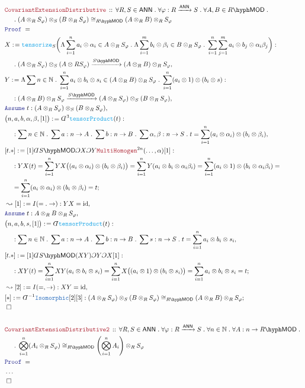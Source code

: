 \documentclass[12pt]{scrartcl}%
\newcommand{\TYPE}[1]{\textcolor{NavyBlue}{\mathtt{#1}}}%
\newcommand{\FUNC}[1]{\textcolor{Cerulean}{\mathtt{#1}}}%
\newcommand{\LOGIC}[1]{\textcolor{Blue}{\mathtt{#1}}}%
\newcommand{\THM}[1]{\textcolor{Maroon}{\mathtt{#1}}}%
\renewcommand{\.}{\; . \;} %
\newcommand{\de}{: \kern 0.1pc =} %
\newcommand{\Theorem}[2]{& \THM{#1} \, :: \, #2 \\ & \Proof = \\ } %
\newcommand{\NewLine}{\\ & \kern 1pc}%
\newcommand{\Page}[1]{ \begin{align*} #1 \end{align*}  }%
\newcommand{ \bd }{ \ByDef }%
\newcommand{\NoProof}{ & \ldots \\ \EndProof}%
\newcommand{\Nat}{\mathbb{N}}%
\DeclareMathOperator*{\id}{id}%
\newcommand{\Say}[3]{& #1 \de #2 : #3, \\} %
\newcommand{\Conclude}[3]{& #1 \de #2 : #3; \\}%
\newcommand{\Derive}[3]{& \leadsto #1 \de #2 : #3, \\} %
\newcommand{\Assume}[2]{& \LOGIC{Assume} \; #1 : #2, \\} %
\newcommand{\QED}{\; \square} %
\newcommand{\EndProof}{& \QED \\} %
\newcommand{\ByDef}{\rotatebox[origin=c]{-180}{$D$}}%
\newcommand{\ByConstr}{\rotatebox[origin=c]{-180}{$C$}}%
\newcommand{\Proof}{\LOGIC{Proof} \; } %
\newcommand{\Arrow}[1]{\xrightarrow{#1}}%
\newcommand{\LMOD}[1]{#1\hyph\mathsf{MOD}} %
\newcommand{\ANN}{\mathsf{ANN}} %
\begin{document}
\Page{
	\Theorem{CovariantExtensionDistributive}{
			\forall R,S \in \ANN \. 
			\forall \varphi : R \Arrow{\ANN} S \.
			\forall A,B \in \LMOD{R} \. \NewLine \. 
			 (A \otimes_R S_\varphi) \otimes_S (B \otimes_R S_\varphi ) \cong_{\LMOD{R}} (A \otimes_R B) \otimes_R  S_\varphi
		}
	\Say{X}{
		\FUNC{tensorize}_S \bigg( 
			 \Lambda   \sum^n_{i=1} a_i \otimes \alpha_i \in A \otimes_R S_\varphi \.
			 \Lambda  \sum^m_{i=1} b_i \otimes \beta_i \in B \otimes_R S_\varphi  \.  
			 \sum^n_{i=1} \sum^m_{j=1} a_i \otimes b_j \otimes \alpha_i \beta_j 
		\bigg)
	}
	{   \NewLine \.(A \otimes_R S_\varphi) \otimes_S (A \otimes R S_\varphi)\Arrow{\LMOD{S}} (A\otimes_R B) \otimes_R S_\varphi } 
	\Say{Y}{
		\Lambda \sum n \in \Nat \. \sum^n_{i=1} a_i \otimes b_i \otimes s_i  \in (A \otimes_R B) \otimes_R S_\varphi \.
		\sum^n_{i=1}( a_i \otimes 1)  \otimes  (b_i \otimes s)
	}
	{ \NewLine : (A \otimes_R B) \otimes_R S_\varphi \Arrow{\LMOD{S}} (A \otimes_R S_\varphi) \otimes_S (B \otimes_R S_\varphi) }
	\Assume{t}{(A \otimes_R S_\varphi) \otimes_S (B \otimes_R S_\varphi)}
	\Say{\big(n,a,b,\alpha,\beta,[1]\big)}{ \bd^3 \FUNC{tensorProduct}(t)}{ \NewLine : 
		\sum n \in \Nat \. \sum a : n \to A \. \sum b : n \to B \. \sum \alpha, \beta : n \to S \.   
		t = \sum^n_{i=1} (a_i \otimes \alpha_i) \otimes (b_i \otimes \beta_i)
	}
	\Conclude{[t.*]}{[1]\bd \LMOD{S}\ByConstr X \ByConstr Y   \THM{MultiHomogen}^{2n}(\ldots,\alpha) [1]}
	{ 
			\NewLine : YX(t) = 
			\sum^n_{i=1} YX\big( (a_i \otimes \alpha_i) \otimes (b_i \otimes \beta_i) \big) =
			\sum^n_{i=1} Y(a_i \otimes b_i \otimes  \alpha_i\beta_i) =
			\sum^n_{i=1} (a_i \otimes 1) \otimes (b_i \otimes \alpha_i\beta_i) = \NewLine = 
			\sum^n_{i=1} (a_i \otimes \alpha_i) \otimes (b_i \otimes \beta_i) =
			t
	}
	\Derive{[1]}{I(=.\to)}{YX = \id}
	\Assume{t}{A \otimes_R B \otimes_R S_\varphi}
	\Say{\big(n,a,b,s,[1]\big)}{\bd \FUNC{tensorProduct}(t)}{ 
		\NewLine : \sum n \in \Nat \. \sum a : n \to A \. \sum b : n \to B \. 
			\sum s : n \to S \. t = \sum^n_{i=1} a_i \otimes b_i \otimes s_i
		}
	\Conclude{[t.*]}{[1]\bd \LMOD{S}(XY)\ByConstr Y \ByConstr X[1]}
	{
		\NewLine : XY(t) =
		\sum^n_{i=1} XY (a_i \otimes  b_i \otimes s_i) = 
		\sum^n_{i=1} X\big( (a_i \otimes 1) \otimes (b_i \otimes s_i ) \big)= 
		\sum^n_{i=1} a_i \otimes b_i \otimes s_i = t
	}
	\Derive{[2]}{I(=,\to)}{XY = \id}
	\Conclude{[*]}{\bd^{-1}\TYPE{Isomorphic}[2][3]}{(A \otimes_R S_\varphi) \otimes_S (B \otimes_R S_\varphi ) \cong_{\LMOD{R}} (A \otimes_R B) \otimes_R  S_\varphi}
	\EndProof
	\\
	\Theorem{CovariantExtensionDistributive2}{
			\forall R,S \in \ANN \. 
			\forall \varphi : R \Arrow{\ANN} S \.
			\forall n \in \Nat \.
			\forall A : n \to \LMOD{R} \. \NewLine \. 
			\bigotimes^n_{i=1} (A_i \otimes_R  S_\varphi) \cong_{\LMOD{R}} \left(\bigotimes^n_{i=1} A_i\right) \otimes_R  S_\varphi
		}
	\NoProof
}
\end{document}
